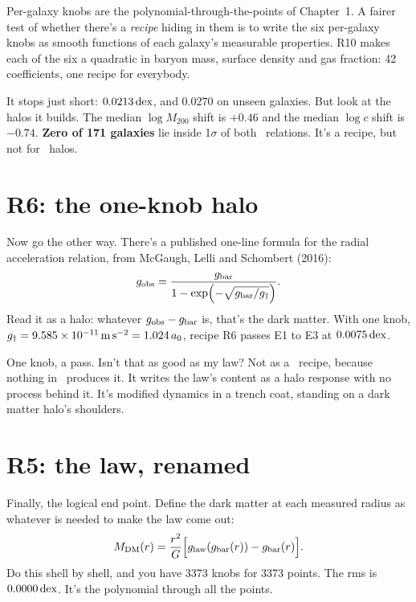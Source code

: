 Per-galaxy knobs are the polynomial-through-the-points of Chapter~1. A fairer test of whether there's a \emph{recipe} hiding in them is to write the six per-galaxy knobs as smooth functions of each galaxy's measurable properties. R10 makes each of the six a quadratic in baryon mass, surface density and gas fraction: 42 coefficients, one recipe for everybody.

It stops just short: $0.0213\,\mathrm{dex}$, and $0.0270$ on unseen galaxies. But look at the halos it builds. The median $\log M_{200}$ shift is $+0.46$ and the median $\log c$ shift is $-0.74$. \textbf{Zero of 171 galaxies} lie inside 1$\sigma$ of both \LCDM\ relations. It's a recipe, but not for \LCDM\ halos.

\section{R6: the one-knob halo}

Now go the other way. There's a published one-line formula for the radial acceleration relation, from McGaugh, Lelli and Schombert (2016):
\begin{equation}
g_{\rm obs}=\frac{g_{\rm bar}}{1-\exp\!\left(-\sqrt{g_{\rm bar}/g_\dagger}\right)}.
\end{equation}
Read it as a halo: whatever $g_{\rm obs}-g_{\rm bar}$ is, that's the dark matter. With one knob, $g_\dagger=9.585\times10^{-11}\,\mathrm{m\,s^{-2}}=1.024\,a_0$, recipe R6 passes E1 to E3 at $0.0075\,\mathrm{dex}$.

One knob, a pass. Isn't that as good as my law? Not as a \LCDM\ recipe, because nothing in \LCDM\ produces it. It writes the law's content as a halo response with no process behind it. It's modified dynamics in a trench coat, standing on a dark matter halo's shoulders.

\section{R5: the law, renamed}

Finally, the logical end point. Define the dark matter at each measured radius as whatever is needed to make the law come out:
\begin{equation}
M_{\rm DM}(r)=\frac{r^2}{G}\Bigl[g_{\rm law}(g_{\rm bar}(r))-g_{\rm bar}(r)\Bigr].
\end{equation}
Do this shell by shell, and you have 3373 knobs for 3373 points. The rms is $0.0000\,\mathrm{dex}$. It's the polynomial through all the points.




